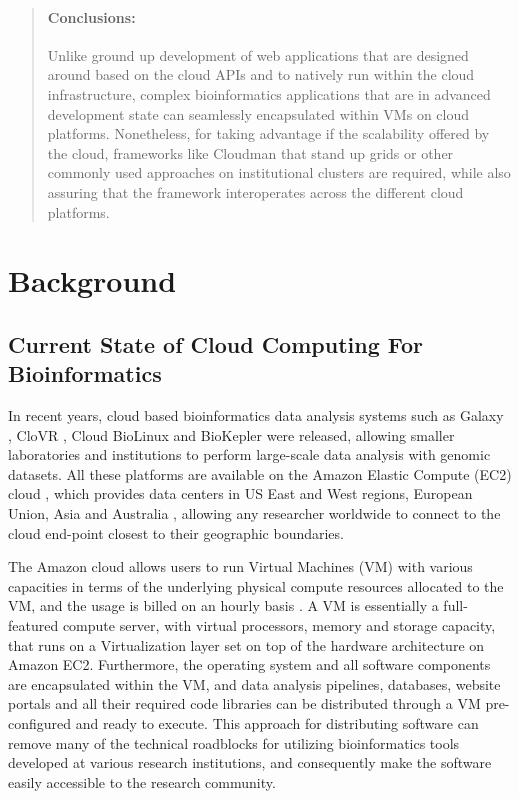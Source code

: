 \documentclass[10pt]{bmc_article}
\newenvironment{bmcformat}{\baselineskip20pt\sloppy\setboolean{publ}{false}}{\baselineskip20pt\sloppy}
\begin{document}
\begin{bmcformat}
\begin{abstract}
\paragraph*{Conclusions:} Unlike ground up development of web applications that are designed around based on the cloud APIs and
to natively run within the cloud infrastructure, complex bioinformatics applications that are in advanced development state can seamlessly
encapsulated within VMs on cloud platforms. Nonetheless, for taking advantage if the scalability offered by the cloud, frameworks
like Cloudman that stand up grids or other commonly used approaches on institutional clusters are required, while also assuring that
the framework interoperates across the different cloud platforms.

\end{abstract}










\section*{Background}
\subsection*{Current State of Cloud Computing For Bioinformatics}

In recent years, cloud based bioinformatics data analysis systems such as Galaxy \cite{Goecks2010}, 
CloVR \cite{Angiuoli2011}, Cloud BioLinux \cite{Krampis2012} and BioKepler \cite{Altintas2011} were
released, allowing smaller laboratories and institutions to perform large-scale data analysis with genomic 
datasets. All these platforms are available on the Amazon Elastic Compute (EC2) cloud \cite{awsec2} , which 
provides data centers in US East and West regions, European Union, Asia and Australia \cite{ec2regions}, 
allowing any researcher worldwide  to connect to the cloud end-point closest to their geographic boundaries.  \pb

The Amazon cloud allows users to run Virtual Machines (VM) with various capacities in terms of the underlying
physical compute resources allocated to the VM, and the usage is billed on an hourly basis \cite{ec2price}. 
A VM is essentially a full-featured compute server, with virtual processors, memory and storage capacity, that runs 
on a Virtualization layer set on top of the hardware architecture on Amazon EC2. Furthermore, the operating system 
and all software components  are  encapsulated  within the VM, and data analysis  pipelines, databases, website portals  
and all their required code libraries can be distributed through a VM pre-configured and ready to execute. 
This approach for distributing software can remove many of the technical roadblocks for utilizing bioinformatics tools
developed at various research institutions, and consequently make the software easily accessible to the research community. \pb


\end{bmcformat}
\end{document}
